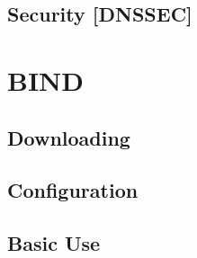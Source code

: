 \subsection{Security [DNSSEC]}
\section{BIND}
\subsection{Downloading}
\subsection{Configuration}
\subsection{Basic Use}

